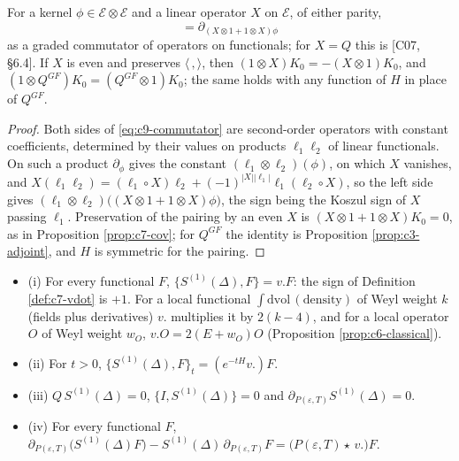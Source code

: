 \begin{lemma}
\label{lem:c9-ops}
For a kernel $\phi\in\mathscr E\otimes\mathscr E$ and a linear operator $X$ on $\mathscr E$, of either parity,
\begin{equation}
[\partial_\phi,X]=\partial_{(X\otimes1+1\otimes X)\phi}
\label{eq:c9-commutator}
\end{equation}
as a graded commutator of operators on functionals; for $X=Q$ this is [C07, §6.4]. If $X$ is even and preserves $\langle\,,\rangle$, then $(1\otimes X)K_0=-(X\otimes1)K_0$, and $(1\otimes Q^{GF})K_0=(Q^{GF}\otimes1)K_0$; the same holds with any function of $H$ in place of $Q^{GF}$.
\end{lemma}

\begin{proof}
Both sides of \eqref{eq:c9-commutator} are second-order operators with constant coefficients, determined by their values on products $\ell_1\ell_2$ of linear functionals. On such a product $\partial_\phi$ gives the constant $(\ell_1\otimes\ell_2)(\phi)$, on which $X$ vanishes, and $X(\ell_1\ell_2)=(\ell_1\circ X)\ell_2+(-1)^{|X||\ell_1|}\ell_1(\ell_2\circ X)$, so the left side gives $(\ell_1\otimes\ell_2)\big((X\otimes1+1\otimes X)\phi\big)$, the sign being the Koszul sign of $X$ passing $\ell_1$. Preservation of the pairing by an even $X$ is $(X\otimes1+1\otimes X)K_0=0$, as in Proposition \ref{prop:c7-cov}; for $Q^{GF}$ the identity is Proposition \ref{prop:c3-adjoint}, and $H$ is symmetric for the pairing.
\end{proof}

\begin{lemma}
\label{lem:c9-SDelta}
\begin{itemize}
\item (i) For every functional $F$, $\{S^{(1)}(\Delta),F\}=v.F$: the sign of Definition \ref{def:c7-vdot} is $+1$. For a local functional $\int\mathrm{dvol}\,(\text{density})$ of Weyl weight $k$ (fields plus derivatives) $v.$ multiplies it by $2(k-4)$, and for a local operator $O$ of Weyl weight $w_O$, $v.O=2(E+w_O)O$ (Proposition \ref{prop:c6-classical}).
\item (ii) For $t>0$, $\{S^{(1)}(\Delta),F\}_t=(e^{-tH}v.)F$.
\item (iii) $Q\,S^{(1)}(\Delta)=0$, $\{I,S^{(1)}(\Delta)\}=0$ and $\partial_{P(\varepsilon,T)}S^{(1)}(\Delta)=0$.
\item (iv) For every functional $F$, $\partial_{P(\varepsilon,T)}\big(S^{(1)}(\Delta)F\big)-S^{(1)}(\Delta)\,\partial_{P(\varepsilon,T)}F=\big(P(\varepsilon,T)\star\,v.\big)F$.
\end{itemize}
\end{lemma}

